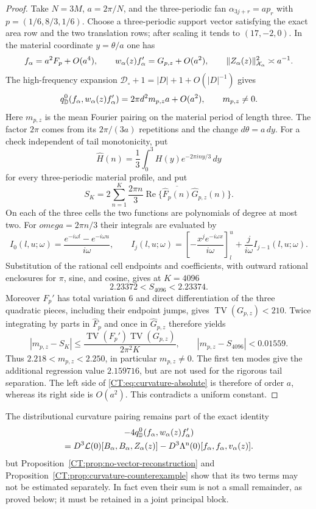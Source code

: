 \begin{proof}
Take $N=3M$, $a=2\pi/N$, and the three-periodic fan
$\alpha_{3j+r}=ap_r$ with $p=(1/6,8/3,1/6)$.  Choose a three-periodic
support vector satisfying the exact area row and the two translation rows;
after scaling it tends to $(17,-2,0)$.  In the material coordinate
$y=\theta/a$ one has
\[
 f_\alpha=a^2F_p+O(a^4),\qquad
 w_\alpha(z)f_\alpha'=G_{p,z}+O(a^2),\qquad
 \|Z_\alpha(z)\|_{\mathcal X_\alpha}^2\asymp a^{-1}.
\]
The high-frequency expansion
$\mathcal D_\circ+1=|D|+1+O(|D|^{-1})$ gives
\[
 q_{\mathbb D}^{0}(f_\alpha,w_\alpha(z)f_\alpha')
 =2\pi d^2m_{p,z}a+O(a^2),
 \qquad m_{p,z}\ne0.
\]
Here $m_{p,z}$ is the mean Fourier pairing on the material period of length
three.  The factor $2\pi$ comes from its $2\pi/(3a)$ repetitions and the
change $d\theta=a\,dy$.  For a check independent of tail monotonicity, put
\[
 \widehat H(n)=\frac13\int_0^3H(y)e^{-2\pi iny/3}\,dy
\]
for every three-periodic material profile, and put
\[
 S_K=2\sum_{n=1}^K\frac{2\pi n}{3}
 \operatorname {Re}\{\overline{\widehat F_p(n)}
                         \widehat G_{p,z}(n)\}.
\]
On each of the three cells the two functions are polynomials of degree at
most two.  For $omega=2\pi n/3$ their integrals are evaluated by
\[
 I_0(l,u;\omega)=\frac{e^{-i\omega l}-e^{-i\omega u}}{i\omega},
 \qquad
 I_j(l,u;\omega)=
 \left[-\frac{x^je^{-i\omega x}}{i\omega}\right]_{l}^{u}
 +\frac{j}{i\omega}I_{j-1}(l,u;\omega).
\]
Substitution of the rational cell endpoints and coefficients, with
outward rational enclosures for $\pi$, sine, and cosine, gives at $K=4096$
\[
 2.23372<S_{4096}<2.23374.
\]
Moreover $F_p'$ has total variation $6$ and direct differentiation of the
three quadratic pieces, including their endpoint jumps, gives
$\operatorname {TV}(G_{p,z})<210$.  Twice integrating by parts in
$\widehat F_p$ and once in $\widehat G_{p,z}$ therefore yields
\[
 |m_{p,z}-S_K|
 \le\frac{\operatorname {TV}(F_p')\operatorname {TV}(G_{p,z})}
          {2\pi^2K},
 \qquad
 |m_{p,z}-S_{4096}|<0.01559.
\]
Thus $2.218<m_{p,z}<2.250$, in particular $m_{p,z}\ne0$.  The first ten
modes give the additional regression value $2.159716$, but are not used
for the rigorous tail separation.  The left side of
\eqref{CT:eq:curvature-absolute} is therefore of order $a$, whereas its right
side is $O(a^2)$.  This contradicts a uniform constant.
\end{proof}

The distributional curvature pairing remains part of the exact identity
\begin{multline}\label{CT:eq:curvature-as-difference}
 -4q_{\mathbb D}^{0}(f_\alpha,w_\alpha(z)f_\alpha')\\
 =D^3\mathcal L(0)[B_\alpha,B_\alpha,Z_\alpha(z)]
  -D^3\Lambda^{\rm n}(0)
    [f_\alpha,f_\alpha,v_\alpha(z)].
\end{multline}
but Proposition~\ref{CT:prop:no-vector-reconstruction} and
Proposition~\ref{CT:prop:curvature-counterexample} show that its two terms may
not be estimated separately.  In fact even their sum is not a small
remainder, as proved below; it must be retained in a joint principal block.

